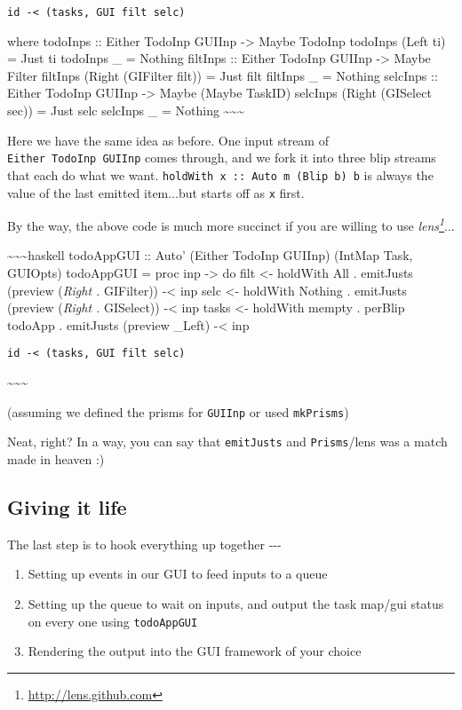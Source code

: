 \documentclass[]{article}
\renewcommand{\href}[2]{#2\footnote{\url{#1}}}
\begin{document}
\begin{verbatim}
id -< (tasks, GUI filt selc)
\end{verbatim}

where todoInps :: Either TodoInp GUIInp -\textgreater{} Maybe TodoInp todoInps
(Left ti) = Just ti todoInps \_ = Nothing filtInps :: Either TodoInp GUIInp
-\textgreater{} Maybe Filter filtInps (Right (GIFilter filt)) = Just filt
filtInps \_ = Nothing selcInps :: Either TodoInp GUIInp -\textgreater{} Maybe
(Maybe TaskID) selcInps (Right (GISelect sec)) = Just selc selcInps \_ = Nothing
\textasciitilde{}\textasciitilde{}\textasciitilde{}

Here we have the same idea as before. One input stream of
\texttt{Either\ TodoInp\ GUIInp} comes through, and we fork it into three blip
streams that each do what we want.
\texttt{holdWith\ x\ ::\ Auto\ m\ (Blip\ b)\ b} is always the value of the last
emitted item...but starts off as \texttt{x} first.

By the way, the above code is much more succinct if you are willing to use
\emph{\href{http://lens.github.com}{lens}}...

\textasciitilde{}\textasciitilde{}\textasciitilde{}haskell todoAppGUI :: Auto'
(Either TodoInp GUIInp) (IntMap Task, GUIOpts) todoAppGUI = proc inp
-\textgreater{} do filt \textless{}- holdWith All . emitJusts (preview
(\emph{Right . }GIFilter)) -\textless{} inp selc \textless{}- holdWith Nothing .
emitJusts (preview (\emph{Right . }GISelect)) -\textless{} inp tasks
\textless{}- holdWith mempty . perBlip todoApp . emitJusts (preview \_Left)
-\textless{} inp

\begin{verbatim}
id -< (tasks, GUI filt selc)
\end{verbatim}

\textasciitilde{}\textasciitilde{}\textasciitilde{}

(assuming we defined the prisms for \texttt{GUIInp} or used
\texttt{\textquotesingle{}\textquotesingle{}mkPrisms})

Neat, right? In a way, you can say that \texttt{emitJusts} and
\texttt{Prisms}/lens was a match made in heaven :)

\subsection{Giving it life}

The last step is to hook everything up together -\/-\/-

\begin{enumerate}
\tightlist
\item
  Setting up events in our GUI to feed inputs to a queue
\item
  Setting up the queue to wait on inputs, and output the task map/gui status on
  every one using \texttt{todoAppGUI}
\item
  Rendering the output into the GUI framework of your choice
\end{enumerate}
\end{document}
